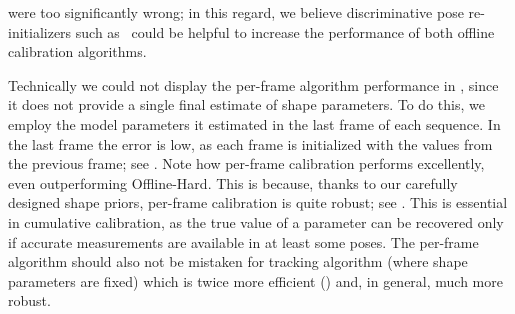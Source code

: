 were too significantly wrong; in this regard, we believe discriminative pose re-initializers such as~\cite{oberweger2015hands} could be helpful to increase the performance of both offline calibration algorithms.


\begin{edit}
Technically we could not display the per-frame algorithm performance in , since it does not provide a single final estimate of shape parameters. To do this, we employ the model parameters it estimated in the last frame of each sequence. In the last frame the error is low, as each frame is initialized with the values from the previous frame; see \VideoReal{}. Note how per-frame calibration performs excellently, even outperforming Offline-Hard. This is because, thanks to our carefully designed shape priors, per-frame calibration is quite robust; see \VideoReal{}. This is essential in cumulative calibration, as the true value of a parameter can be recovered only if accurate measurements are available in at least some poses. The per-frame algorithm should also not be mistaken for tracking algorithm (where shape parameters are fixed) which is twice more efficient () and, in general, much more robust.
\end{edit}


